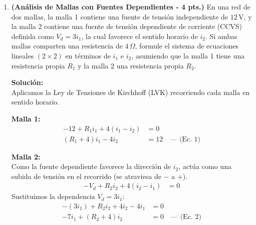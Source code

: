 \documentclass[12pt, a4paper]{article}
\begin{document}
\begin{enumerate}[leftmargin=*, itemsep=2em]
    \textbf{Solución:} \\
    Debido a que una fuente de tensión (dependiente en este caso) está conectada entre dos nodos de no referencia (Nodos 1 y 2), se debe formar un \textbf{supernodo} que englobe a ambos.
    \begin{itemize}
        \item \textbf{Ecuación de restricción:} Asumiendo la convención típica donde la fuente va del Nodo 1 (+) al Nodo 2 (-), tenemos $V_1 - V_2 = V_x$.
        Sustituyendo el valor de la fuente dependiente:
        \[ V_1 - V_2 = 4 I_a \]
        Por la Ley de Ohm, sabemos que la corriente de control $I_a$ que fluye del Nodo 2 a tierra es $I_a = \frac{V_2 - 0}{2} = \frac{V_2}{2}$. Sustituimos en la restricción:
        \[ V_1 - V_2 = 4 \left( \frac{V_2}{2} \right) = 2 V_2 \implies \mathbf{V_1 - 3V_2 = 0} \]
        \item \textbf{Ecuación de LKC en el Supernodo:} La suma algebraica de las corrientes que abandonan el supernodo es igual a cero. (Se suman las corrientes de las ramas conectadas al Nodo 1 más las ramas del Nodo 2, exceptuando la rama interna de la fuente dependiente):
        \[ \sum i_{\text{salientes\_nodo1}} + \sum i_{\text{salientes\_nodo2}} = 0 \]
    \end{itemize}

    \item \textbf{(Análisis de Mallas con Fuentes Dependientes - 4 pts.)} En una red de dos mallas, la malla 1 contiene una fuente de tensión independiente de $12\,\text{V}$, y la malla 2 contiene una fuente de tensión dependiente de corriente (CCVS) definida como $V_d = 3 i_1$, la cual favorece el sentido horario de $i_2$. Si ambas mallas comparten una resistencia de $4\,\Omega$, formule el sistema de ecuaciones lineales $(2 \times 2)$ en términos de $i_1$ e $i_2$, asumiendo que la malla 1 tiene una resistencia propia $R_1$ y la malla 2 una resistencia propia $R_2$.

    \textbf{Solución:} \\
    Aplicamos la Ley de Tensiones de Kirchhoff (LVK) recorriendo cada malla en sentido horario.
    
    \textbf{Malla 1:}
    \begin{align*}
        -12 + R_1 i_1 + 4(i_1 - i_2) &= 0 \\
        (R_1 + 4)i_1 - 4 i_2 &= 12 \quad \text{--- (Ec. 1)}
    \end{align*}
    
    \textbf{Malla 2:} \\
    Como la fuente dependiente favorece la dirección de $i_2$, actúa como una subida de tensión en el recorrido (se atraviesa de $-$ a $+$).
    \begin{align*}
        -V_d + R_2 i_2 + 4(i_2 - i_1) &= 0 
    \end{align*}
    Sustituimos la dependencia $V_d = 3 i_1$:
    \begin{align*}
        -(3 i_1) + R_2 i_2 + 4 i_2 - 4 i_1 &= 0 \\
        -7 i_1 + (R_2 + 4) i_2 &= 0 \quad \text{--- (Ec. 2)}
    \end{align*}
    

\end{enumerate}
\end{document}
